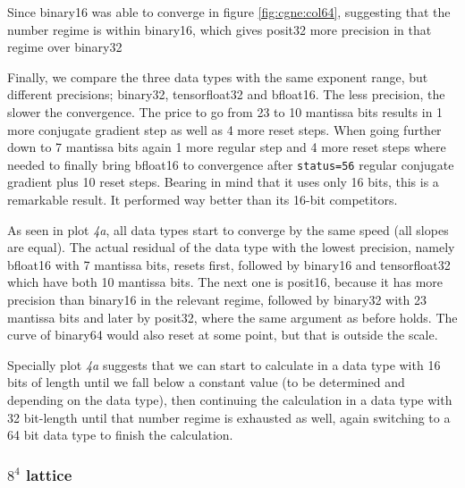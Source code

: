 \documentclass{article}
\theoremstyle{plain} %
\theoremstyle{convention} %
\theoremstyle{remark} %
\def\code#1{\texttt{#1}}
\numberwithin{equation}{section}
\begin{document}
Since \gls{binary16} was able to converge in figure \ref{fig:cgne:col64}, suggesting that the number regime is within \gls{binary16}, which gives \gls{posit32} more precision in that regime over \gls{binary32}

Finally, we compare the three data types with the same exponent range, but different precisions; \gls{binary32}, \gls{tensorfloat32} and \gls{bfloat16}. The less precision, the slower the convergence. The price to go from \num{23} to \num{10} mantissa bits results in \num{1} more conjugate gradient step as well as \num{4} more reset steps. When going further down to \num{7} mantissa bits again \num{1} more regular step and \num{4} more reset steps where needed to finally bring \gls{bfloat16} to convergence after \code{status=56} regular conjugate gradient plus \num{10} reset steps. Bearing in mind that it uses only \num{16} bits, this is a remarkable result. It performed way better than its \num{16}-bit competitors.

As seen in plot \textit{4a}, all data types start to converge by the same speed (all slopes are equal). The actual residual of the data type with the lowest precision, namely \gls{bfloat16} with \num{7} mantissa bits, resets first, followed by \gls{binary16} and \gls{tensorfloat32} which have both \num{10} mantissa bits. The next one is \gls{posit16}, because it has more precision than \gls{binary16} in the relevant regime, followed by \gls{binary32} with \num{23} mantissa bits and later by \gls{posit32}, where the same argument as before holds. The curve of \gls{binary64} would also reset at some point, but that is outside the scale.

Specially plot \textit{4a} suggests that we can start to calculate in a data type with \num{16} bits of length until we fall below a constant value (to be determined and depending on the data type), then continuing the calculation in a data type with \num{32} bit-length until that number regime is exhausted as well, again switching to a \num{64} bit data type to finish the calculation.

\subsubsection{$8^4$ lattice}
\end{document}

